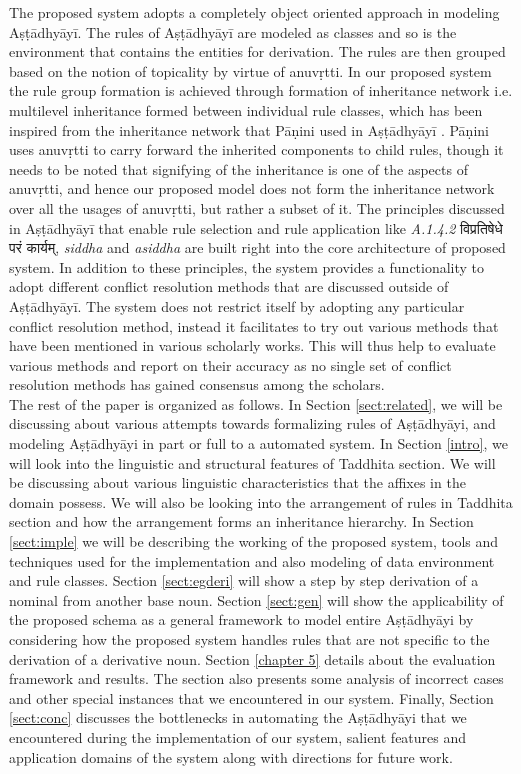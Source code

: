 \documentclass[11pt]{article}
\begin{document}
The proposed system adopts a completely object oriented approach in modeling Aṣṭādhyāyī. The rules of Aṣṭādhyāyī are modeled as classes and so is the environment that contains the entities for derivation. The rules are then grouped based on the notion of topicality by virtue of anuvṛtti. In our proposed system the rule group formation is achieved through formation of inheritance network i.e. multilevel inheritance formed between individual rule classes, which has been inspired from the inheritance network that Pāṇini used in Aṣṭādhyāyī \cite{deo07}. Pāṇini uses anuvṛtti to carry forward the inherited components to child rules, though it needs to be noted that signifying of the inheritance is one of the aspects of anuvṛtti, and hence our proposed model does not form the inheritance network over all the usages of anuvṛtti, but rather a subset of it. The principles discussed in Aṣṭādhyāyī that enable rule selection and rule application like {\sl A.1.4.2} {\skt विप्रतिषेधे परं कार्यम्}, {\sl siddha} and {\sl asiddha} are built right into the core architecture of proposed system. In addition to these principles, the system provides a functionality to adopt different conflict resolution methods that are discussed outside of Aṣṭādhyāyī. The system does not restrict itself by adopting any particular conflict resolution method, instead it facilitates to try out various methods that have been mentioned in various scholarly works. This will thus help to evaluate various methods and report on their accuracy as no single set of conflict resolution methods has gained consensus among the scholars.
\\
The rest of the paper is organized as follows. In Section \ref{sect:related}, we will be discussing about various attempts towards formalizing rules of Aṣṭādhyāyi, and modeling Aṣṭādhyāyi in part or full to a automated system. In Section \ref{intro}, we will look into the linguistic and structural features of Taddhita section. We will be discussing about various linguistic characteristics that the affixes in the domain possess. We will also be looking into the arrangement of rules in Taddhita section and how the arrangement forms an inheritance hierarchy. In Section \ref{sect:imple} we will be describing the working of the proposed system, tools and techniques used for the implementation and also modeling of data environment and rule classes. Section \ref{sect:egderi} will show a step by step derivation of a nominal from another base noun. Section \ref{sect:gen} will show the applicability of the proposed schema as a general framework to model entire Aṣṭādhyāyi by considering how the proposed system handles rules that are not specific to the derivation of a derivative noun. Section \ref{chapter 5} details about the evaluation framework and results. The section also presents some analysis of incorrect cases and other special instances that we encountered in our system. Finally, Section \ref{sect:conc} discusses the bottlenecks in automating the Aṣṭādhyāyi that we encountered during the implementation of our system, salient features and application domains of the system along with directions for future work.
\end{document}
